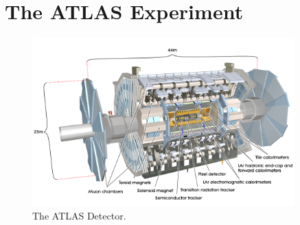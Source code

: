 \section{The ATLAS Experiment}

\begin{figure}
\centering
\includegraphics[width=0.9\textwidth]{figures/Detector/AtlasDetector.jpg}
  \caption{The ATLAS Detector.}
\label{Det:ATLAS}
\end{figure}

